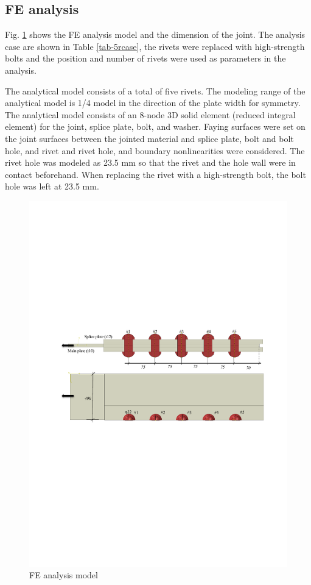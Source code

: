 \subsection{FE analysis}

Fig. \ref{fig-femodl-5r} shows the FE analysis model and the dimension of the joint. The analysis case are shown in Table \ref{tab-5rcase}, the rivets were replaced with high-strength bolts and the position and number of rivets were used as parameters in the analysis.

The analytical model consists of a total of five rivets. The modeling range of the analytical model is 1/4 model in the direction of the plate width for symmetry. The analytical model consists of an 8-node 3D solid element (reduced integral element) for the joint, splice plate, bolt, and washer. Faying surfaces were set on the joint surfaces between the jointed material and splice plate, bolt and bolt hole, and rivet and rivet hole, and boundary nonlinearities were considered. The rivet hole was modeled as 23.5 mm so that the rivet and the hole wall were in contact beforehand. When replacing the rivet with a high-strength bolt, the bolt hole was left at 23.5 mm.

\begin{figure}
    \centering
    \includegraphics[width=0.9\linewidth]{imgs//ch4/fig-femodl-5r.pdf}
    \caption{FE analysis model}
    \label{fig-femodl-5r}
\end{figure}

